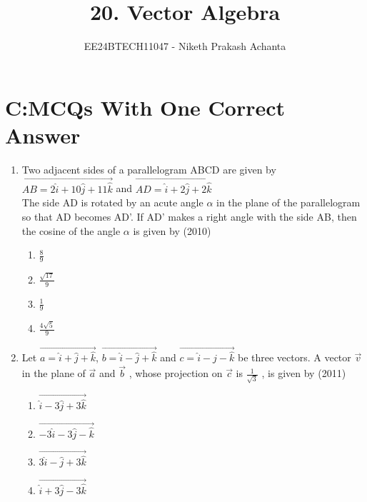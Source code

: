\documentclass[journal,12pt,twocolumn]{IEEEtran}
\theoremstyle{remark}
\begin{document}

\vspace{3cm}

\title{20. Vector Algebra}
\author{EE24BTECH11047 - Niketh Prakash Achanta}
\maketitle
\newpage
\bigskip
\section{C:MCQs With One Correct Answer}
\renewcommand{\thefigure}{\theenumi}
\renewcommand{\thetable}{\theenumi}
\begin{enumerate}
	\item %
		Two adjacent sides of a parallelogram ABCD are given by $\vec{AB = 2\hat{i}+10\hat{j}+11\hat{k}}$ and $\vec{AD = \hat{i}+2\hat{j}+2\hat{k}}$ \\
The side AD is rotated by an acute angle $\alpha$ in the plane of the parallelogram so that AD becomes AD'. If AD' makes a right angle with the side AB, then the cosine of the angle $\alpha$ is given by \hfill{(2010)}\\
\begin{enumerate}
	\item $\frac{8}{9}$
	\item $\frac{\sqrt{17}}{9}$
	\item $\frac{1}{9}$
	\item $\frac{4\sqrt{5}}{9}$\\
\end{enumerate}

        \item %
		Let $\vec{a=\hat{i}+\hat{j}+\hat{k}}$, $\vec{b=\hat{i}-\hat{j}+\hat{k}}$ and $\vec{c=\hat{i}-\hat{j}-\hat{k}}$ be three vectors. A vector $\vec{v}$ in the plane of $\vec{a}$ and $\vec{b}$ , whose projection on $\vec{c}$ is $\frac{1}{\sqrt{3}}$ , is given by \hfill{(2011)}\\
\begin{enumerate}
	\item $\vec{\hat{i}-3\hat{j}+3\hat{k}}$
	\item $\vec{-3\hat{i}-3\hat{j}-\hat{k}}$
	\item $\vec{3\hat{i}-\hat{j}+3\hat{k}}$
	\item $\vec{\hat{i}+3\hat{j}-3\hat{k}}$\\
\end{enumerate}
       

\end{enumerate}
\end{document}
